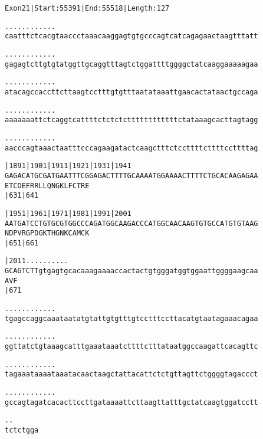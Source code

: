 \documentclass{article}
\begin{document}
\newpage
\begin{alltt}
Exon 21 | Start: 55391 | End: 55518 | Length: 127

.    .    .    .    .    .    .    .    .    .    .    .
caatttctcacgtaaccctaaacaaggagtgtgcccagtcatcagagaactaagtttatt



.    .    .    .    .    .    .    .    .    .    .    .
gagagtcttgtgtatggttgcaggtttagtctggattttggggctatcaaggaaaaagaa



.    .    .    .    .    .    .    .    .    .    .    .
atacagccaccttcttaagtcctttgtgtttaatataaattgaacactataactgccaga



.    .    .    .    .    .    .    .    .    .    .    .
aaaaaaattctcaggtcattttctctctcttttttttttttctataaagcacttagtagg



.    .    .    .    .    .    .    .    .    .    .    .
aacccagtaaactaatttcccagaagatactcaagctttctccttttcttttccttttag



   |1891     |1901     |1911     |1921     |1931     |1941
GAGACATGCGATGAATTTCGGAGACTTTTGCAAAATGGAAAACTTTTCTGCACAAGAGAA
E  T  C  D  E  F  R  R  L  L  Q  N  G  K  L  F  C  T  R  E
   |631                          |641

   |1951     |1961     |1971     |1981     |1991     |2001
AATGATCCTGTGCGTGGCCCAGATGGCAAGACCCATGGCAACAAGTGTGCCATGTGTAAG
N  D  P  V  R  G  P  D  G  K  T  H  G  N  K  C  A  M  C  K
   |651                          |661

   |2011    .    .    .    .    .    .    .    .    .    .
GCAGTCTTgtgagtgcacaaagaaaaccactactgtgggatggtggaattggggaagcaa
A  V  F
   |671

\end{alltt}
\newpage
\begin{alltt}
  .    .    .    .    .    .    .    .    .    .    .    .
tgagccaggcaaataatatgtattgtgtttgtcctttccttacatgtaatagaaacagaa



  .    .    .    .    .    .    .    .    .    .    .    .
ggttatctgtaaagcatttgaaataaatcttttctttataatggccaagattcacagttc



  .    .    .    .    .    .    .    .    .    .    .    .
tagaaataaaataaatacaactaagctattacattctctgttagttctggggtagaccct



  .    .    .    .    .    .    .    .    .    .    .    .
gccagtagatcacacttccttgataaaattcttaagttatttgctatcaagtggatcctt



  .    .
tctctgga


\end{alltt}
\end{document}
